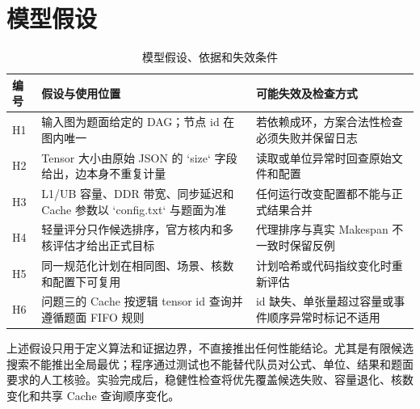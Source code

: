 \section{模型假设}
\begin{table}[H]\centering\caption{模型假设、依据和失效条件}
\begin{tabularx}{\linewidth}{lYY}\toprule
编号 & 假设与使用位置 & 可能失效及检查方式\\\midrule
H1 & 输入图为题面给定的 DAG；节点 id 在图内唯一 & 若依赖成环，方案合法性检查必须失败并保留日志\\
H2 & Tensor 大小由原始 JSON 的 `size` 字段给出，边本身不重复计量 & 读取或单位异常时回查原始文件和配置\\
H3 & L1/UB 容量、DDR 带宽、同步延迟和 Cache 参数以 `config.txt` 与题面为准 & 任何运行改变配置都不能与正式结果合并\\
H4 & 轻量评分只作候选排序，官方核内和多核评估才给出正式目标 & 代理排序与真实 Makespan 不一致时保留反例\\
H5 & 同一规范化计划在相同图、场景、核数和配置下可复用 & 计划哈希或代码指纹变化时重新评估\\
H6 & 问题三的 Cache 按逻辑 tensor id 查询并遵循题面 FIFO 规则 & id 缺失、单张量超过容量或事件顺序异常时标记不适用\\\bottomrule
\end{tabularx}\end{table}

上述假设只用于定义算法和证据边界，不直接推出任何性能结论。尤其是有限候选搜索不能推出全局最优；程序通过测试也不能替代队员对公式、单位、结果和题面要求的人工核验。实验完成后，稳健性检查将优先覆盖候选失败、容量退化、核数变化和共享 Cache 查询顺序变化。
